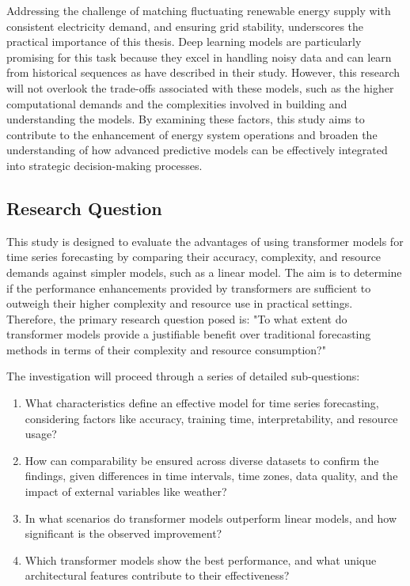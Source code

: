 \documentclass{article}
\begin{document}
Addressing the challenge of matching fluctuating renewable energy supply with consistent electricity demand, and ensuring grid stability, underscores the practical importance of this thesis. Deep learning models are particularly promising for this task because they excel in handling noisy data and can learn from historical sequences as \cite{deep-learning_general_info} have described in their study. However, this research will not overlook the trade-offs associated with these models, such as the higher computational demands and the complexities involved in building and understanding the models. By examining these factors, this study aims to contribute to the enhancement of energy system operations and broaden the understanding of how advanced predictive models can be effectively integrated into strategic decision-making processes.


\subsection{Research Question}

This study is designed to evaluate the advantages of using transformer models for time series forecasting by comparing their accuracy, complexity, and resource demands against simpler models, such as a linear model. The aim is to determine if the performance enhancements provided by transformers are sufficient to outweigh their higher complexity and resource use in practical settings. Therefore, the primary research question posed is: "To what extent do transformer models provide a justifiable benefit over traditional forecasting methods in terms of their complexity and resource consumption?"

The investigation will proceed through a series of detailed sub-questions:

\begin{enumerate}
    \item What characteristics define an effective model for time series forecasting, considering factors like accuracy, training time, interpretability, and resource usage?
    \item How can comparability be ensured across diverse datasets to confirm the findings, given differences in time intervals, time zones, data quality, and the impact of external variables like weather?
    \item In what scenarios do transformer models outperform linear models, and how significant is the observed improvement?
    \item Which transformer models show the best performance, and what unique architectural features contribute to their effectiveness?
\end{enumerate}
\end{document}
